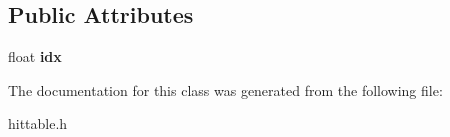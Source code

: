 \subsection*{Public Attributes}
\begin{DoxyCompactItemize}
\item 
\mbox{\label{classdielectric_aae76571f5f1161abca541ecfdd86a60c}} 
float {\bfseries idx}
\end{DoxyCompactItemize}


The documentation for this class was generated from the following file\+:\begin{DoxyCompactItemize}
\item 
hittable.\+h\end{DoxyCompactItemize}
